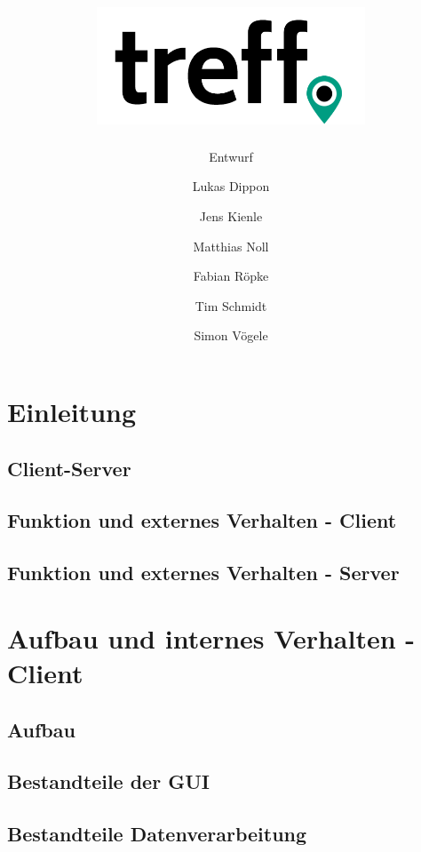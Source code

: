 \documentclass[parskip=full,11pt]{scrartcl}
\title{\includegraphics[width = 80mm]{images/logo_crop.png}}
\subtitle{\huge Entwurf}
\author{Lukas Dippon
        \and Jens Kienle
        \and Matthias Noll
        \and Fabian Röpke
        \and Tim Schmidt
        \and Simon Vögele}
\begin{document}
\maketitle
\thispagestyle{empty} %

\pagebreak
\tableofcontents

\pagebreak
\section{Einleitung}

\subsection{Client-Server}

\subsection{Funktion und externes Verhalten - Client}

\subsection{Funktion und externes Verhalten - Server}

\pagebreak
\section{Aufbau und internes Verhalten - Client}

\subsection{Aufbau}

\subsection{Bestandteile der GUI}

\subsection{Bestandteile Datenverarbeitung}
\end{document}

